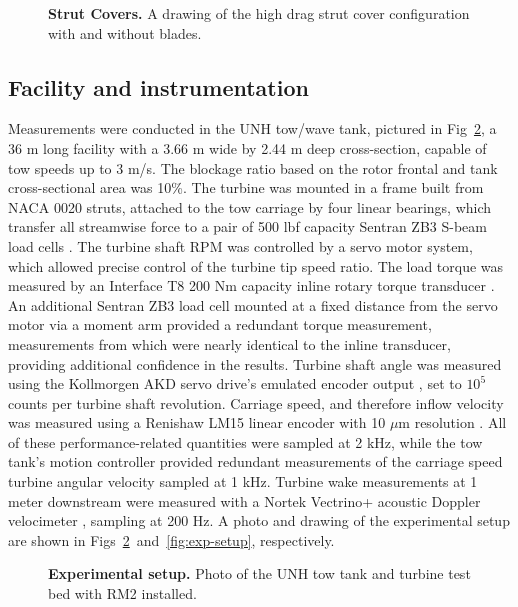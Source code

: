 \documentclass[10pt,letterpaper]{article}
\begin{document}
\begin{figure}

    \caption{{\bf Strut Covers.} A drawing of the high drag strut cover
        configuration with and without blades.}

    \label{fig:covers}
\end{figure}


\subsection*{Facility and instrumentation}

Measurements were conducted in the UNH tow/wave tank, pictured in
Fig~\ref{fig:exp-setup-photo}, a 36 m long facility with a 3.66 m wide by 2.44
m deep cross-section, capable of tow speeds up to 3 m/s. The blockage ratio
based on the rotor frontal and tank cross-sectional area was 10\%. The turbine
was mounted in a frame built from NACA 0020 struts, attached to the tow carriage
by four linear bearings, which transfer all streamwise force to a pair of 500
lbf capacity Sentran ZB3 S-beam load cells \cite{SentranZB}. The turbine shaft
RPM was controlled by a servo motor system, which allowed precise control of the
turbine tip speed ratio. The load torque was measured by an Interface T8 200 Nm
capacity inline rotary torque transducer \cite{InterfaceT8}. An additional
Sentran ZB3 load cell mounted at a fixed distance from the servo motor via a
moment arm provided a redundant torque measurement, measurements from which were
nearly identical to the inline transducer, providing additional confidence in
the results. Turbine shaft angle was measured using the Kollmorgen AKD servo
drive's emulated encoder output \cite{KollmorgenAKD}, set to $10^5$ counts per
turbine shaft revolution. Carriage speed, and therefore inflow velocity was
measured using a Renishaw LM15 linear encoder with 10 $\mu$m resolution
\cite{RenishawLM15}. All of these performance-related quantities were sampled at
2 kHz, while the tow tank's motion controller provided redundant measurements of
the carriage speed turbine angular velocity sampled at 1 kHz. Turbine wake
measurements at 1 meter downstream were measured with a Nortek Vectrino+
acoustic Doppler velocimeter \cite{NortekVectrino}, sampling at 200 Hz. A photo
and drawing of the experimental setup are shown in
Figs~\ref{fig:exp-setup-photo}~and~\ref{fig:exp-setup}, respectively.

\begin{figure}
    \centering


    \caption{\textbf{Experimental setup.} Photo of the UNH tow tank and turbine
    test bed with RM2 installed.}

    \label{fig:exp-setup-photo}
\end{figure}
\end{document}
